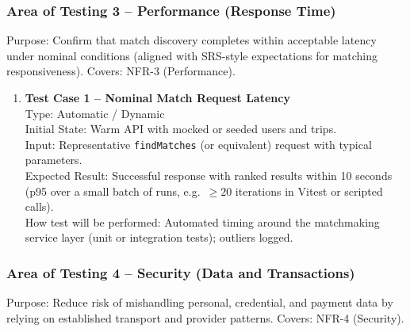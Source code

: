 \documentclass[12pt, titlepage]{article}
\begin{document}
\subsubsection{Area of Testing 3 – Performance (Response Time)}

Purpose: Confirm that match discovery completes within acceptable latency under nominal conditions (aligned with SRS-style expectations for matching responsiveness).  
Covers: NFR-3 (Performance).

\begin{enumerate}
\item \textbf{Test Case 1 – Nominal Match Request Latency}\\
Type: Automatic / Dynamic\\
Initial State: Warm API with mocked or seeded users and trips.\\
Input: Representative \texttt{findMatches} (or equivalent) request with typical parameters.\\
Expected Result: Successful response with ranked results within 10 seconds (p95 over a small batch of runs, e.g.\ $\geq 20$ iterations in Vitest or scripted calls).\\
How test will be performed: Automated timing around the matchmaking service layer (unit or integration tests); outliers logged.\\
\end{enumerate}

\subsubsection{Area of Testing 4 – Security (Data and Transactions)}

Purpose: Reduce risk of mishandling personal, credential, and payment data by relying on established transport and provider patterns.  
Covers: NFR-4 (Security).
\end{document}

